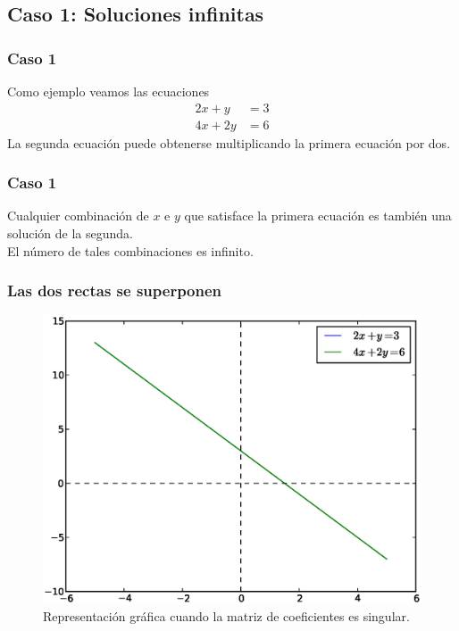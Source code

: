 \subsection*{Caso 1: Soluciones infinitas}
\begin{frame}
\frametitle{Caso 1}
Como ejemplo veamos las ecuaciones
\begin{align*}
2x + y &= 3 \\
4x + 2y &= 6
\end{align*}
\pause
La segunda ecuación puede obtenerse multiplicando la primera ecuación por dos.
\end{frame}
\begin{frame}
\frametitle{Caso 1}
Cualquier combinación de $x$ e $y$ que satisface la primera ecuación es también una solución de la segunda.
\\
\bigskip
El número de tales combinaciones es infinito.
\end{frame}
\begin{frame}
\frametitle{Las dos rectas se superponen}
\begin{figure}
	\centering
	\includegraphics[scale=0.4]{Imagenes/Grafica01.eps}
	\caption{Representación gráfica cuando la matriz de coeficientes es singular.}
\end{figure}
\end{frame}
